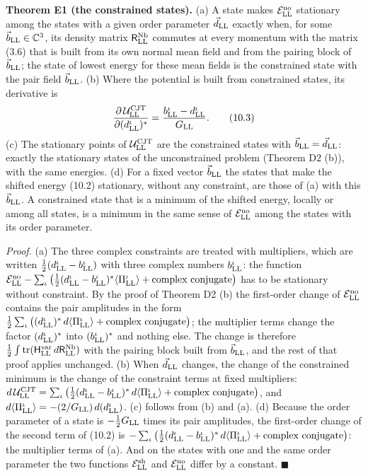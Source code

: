 \documentclass[
  10pt,
]{article}
\begin{document}
\textbf{Theorem E1 (the constrained states).} (a) A state makes
\(\mathcal E^{\rm no}_{\rm LL}\) stationary among the states with a
given order parameter \(\vec d_{\rm LL}\) exactly when, for some
\(\vec b_{\rm LL}\in\mathbb C^3\), its density matrix
\(\mathsf R^{\rm Nb}_{\rm LL}\) commutes at every momentum with the
matrix (3.6) that is built from its own normal mean field and from the
pairing block of \(\vec b_{\rm LL}\); the state of lowest energy for
these mean fields is the constrained state with the pair field
\(\vec b_{\rm LL}\). (b) Where the potential is built from constrained
states, its derivative is
\[\frac{\partial\,\mathcal U^{\rm CJT}_{\rm LL}}{\partial(d^\iota_{\rm LL})^*}=\frac{b^\iota_{\rm LL}-d^\iota_{\rm LL}}{G_{\rm LL}}.\tag{10.3}\]
(c) The stationary points of \(\mathcal U^{\rm CJT}_{\rm LL}\) are the
constrained states with \(\vec b_{\rm LL}=\vec d_{\rm LL}\): exactly the
stationary states of the unconstrained problem (Theorem D2 (b)), with
the same energies. (d) For a fixed vector \(\vec b_{\rm LL}\) the states
that make the shifted energy (10.2) stationary, without any constraint,
are those of (a) with this \(\vec b_{\rm LL}\). A constrained state that
is a minimum of the shifted energy, locally or among all states, is a
minimum in the same sense of \(\mathcal E^{\rm no}_{\rm LL}\) among the
states with its order parameter.

\emph{Proof.} (a) The three complex constraints are treated with
multipliers, which are written
\(\tfrac12(d^\iota_{\rm LL}-b^\iota_{\rm LL})\) with three complex
numbers \(b^\iota_{\rm LL}\): the function
\(\mathcal E^{\rm no}_{\rm LL}-\sum_\iota\big(\tfrac12(d^\iota_{\rm LL}-b^\iota_{\rm LL})^*\langle\Pi^\iota_{\rm LL}\rangle+\text{complex conjugate}\big)\)
has to be stationary without constraint. By the proof of Theorem D2 (b)
the first-order change of \(\mathcal E^{\rm no}_{\rm LL}\) contains the
pair amplitudes in the form
\(\tfrac12\sum_\iota\big((d^\iota_{\rm LL})^*\,d\langle\Pi^\iota_{\rm LL}\rangle+\text{complex conjugate}\big)\);
the multiplier terms change the factor \((d^\iota_{\rm LL})^*\) into
\((b^\iota_{\rm LL})^*\) and nothing else. The change is therefore
\(\tfrac12\int\mathrm{tr}(\mathsf H^{\rm var}_{\rm LL}\,d\mathsf R^{\rm Nb}_{\rm LL})\)
with the pairing block built from \(\vec b_{\rm LL}\), and the rest of
that proof applies unchanged. (b) When \(\vec d_{\rm LL}\) changes, the
change of the constrained minimum is the change of the constraint terms
at fixed multipliers:
\(d\,\mathcal U^{\rm CJT}_{\rm LL}=\sum_\iota\big(\tfrac12(d^\iota_{\rm LL}-b^\iota_{\rm LL})^*\,d\langle\Pi^\iota_{\rm LL}\rangle+\text{complex conjugate}\big)\),
and
\(d\langle\Pi^\iota_{\rm LL}\rangle=-(2/G_{\rm LL})\,d(d^\iota_{\rm LL})\).
(c) follows from (b) and (a). (d) Because the order parameter of a state
is \(-\tfrac12G_{\rm LL}\) times its pair amplitudes, the first-order
change of the second term of (10.2) is
\(-\sum_\iota\big(\tfrac12(d^\iota_{\rm LL}-b^\iota_{\rm LL})^*\,d\langle\Pi^\iota_{\rm LL}\rangle+\text{complex conjugate}\big)\):
the multiplier terms of (a). And on the states with one and the same
order parameter the two functions \(\mathcal E^{\rm sh}_{\rm LL}\) and
\(\mathcal E^{\rm no}_{\rm LL}\) differ by a constant. \(\blacksquare\)
\end{document}
